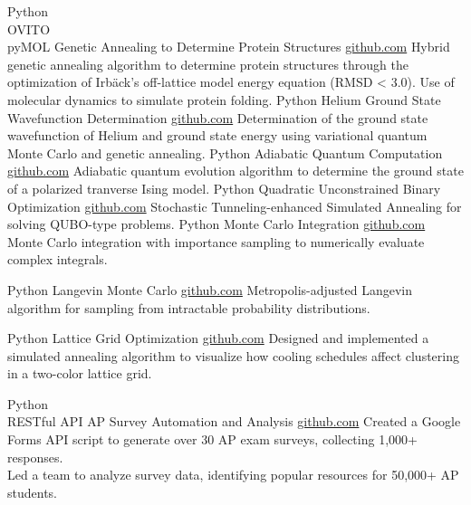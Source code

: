 \documentclass[9pt]{developercv} %
\begin{document}
\begin{entrylist}
    \entry
		{Python \\ OVITO \\ pyMOL }
		{Genetic Annealing to Determine Protein Structures}
		{\href{https://github.com/lonelyneutrin0/Protein-Structure-Prediction}{github.com}}
		{Hybrid genetic annealing algorithm to determine protein structures through the optimization of Irbäck's off-lattice model energy equation (RMSD < 3.0). Use of molecular dynamics to simulate protein folding.}
    \entry
		{Python}
		{Helium Ground State Wavefunction Determination}
		{\href{https://github.com/lonelyneutrin0/QMCGA}{github.com}}
		{Determination of the ground state wavefunction of Helium and ground state energy using variational quantum Monte Carlo and genetic annealing.}
	\entry
		{Python}
		{Adiabatic Quantum Computation}
		{\href{https://github.com/lonelyneutrin0/QA}{github.com}}
		{Adiabatic quantum evolution algorithm to determine the ground state of a polarized tranverse Ising model.}
	\entry
		{Python}
		{Quadratic Unconstrained Binary Optimization}
		{\href{https://github.com/lonelyneutrin0/qubo}{github.com}}
		{Stochastic Tunneling-enhanced Simulated Annealing for solving QUBO-type problems.}
	\entry
		{Python}
		{Monte Carlo Integration}
		{\href{https://github.com/lonelyneutrin0/MNI}{github.com}}
		{Monte Carlo integration with importance sampling to numerically evaluate complex integrals.}
	
	\entry
		{Python}
		{Langevin Monte Carlo}
		{\href{https://github.com/lonelyneutrin0/LMC}{github.com}}
		{Metropolis-adjusted Langevin algorithm for sampling from intractable probability distributions.}
	
	\entry
		{Python}
		{Lattice Grid Optimization}
		{\href{https://github.com/lonelyneutrin0/lattice_grid}{github.com}}
		{Designed and implemented a simulated annealing algorithm to visualize how cooling schedules affect clustering in a two-color lattice grid.}
	
	\entry
	{Python \\ RESTful API}
	{AP Survey Automation and Analysis}
	{\href{https://github.com/lonelyneutrin0/APSurveyAutomation}{github.com}}
	{Created a Google Forms API script to generate over 30 AP exam surveys, collecting 1,000+ responses.\\Led a team to analyze survey data, identifying popular resources for 50,000+ AP students.}
	\end{entrylist}
	
\end{document}

